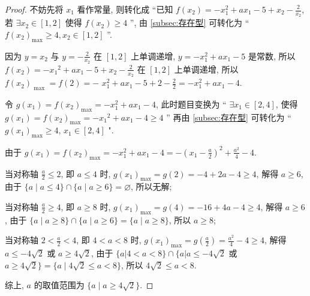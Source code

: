 \begin{proof}
  不妨先将 \({x}_{1}\) 看作常量, 则转化成 “已知 \(f\left( {x}_{2}\right)  =  -{x}_{1}^{2} + a{x}_{1} -5 + {x}_{2} -\frac{2}{{x}_{2}}\), 若 \(\exists {x}_{2} \in  \left\lbrack  {1, 2}\right\rbrack\) 使得 \(f\left( {x}_{2}\right)  \geq  4\) ”, 由 \ref{subsec:存在型} 可转化为 “ \(f{\left( {x}_{2}\right) }_{\max } \geq  4, {x}_{2} \in  \left\lbrack  {1, 2}\right\rbrack\) ”.

因为 \(y = {x}_{2}\) 与 \(y =  -\frac{2}{{x}_{2}}\) 在 \(\left\lbrack  {1, 2}\right\rbrack\) 上单调递增, \(y =  -{x}_{1}^{2} + a{x}_{1} -5\) 是常数, 所以 \(f\left( {x}_{2}\right)  =  -{x}_{1}{}^{2} + a{x}_{1} -5 + {x}_{2} -\frac{2}{{x}_{2}}\) 在 \(\left\lbrack  {1, 2}\right\rbrack\) 上单调递增, 所以 \(f{\left( {x}_{2}\right) }_{\text{ max }} = f\left( 2\right)  =  -\)  \({x}_{1}^{2} + a{x}_{1} -5 + 2 -\frac{2}{2} =  -{x}_{1}^{2} + a{x}_{1} -4.\)

令 \(g\left( {x}_{1}\right)  = f{\left( {x}_{2}\right) }_{\max } =  -{x}_{1}^{2} + a{x}_{1} -4\), 此时题目变换为 “ \(\exists {x}_{1} \in  \left\lbrack  {2, 4}\right\rbrack\), 使得 \(g\left( {x}_{1}\right)  = f{\left( {x}_{2}\right) }_{\max } =  -{x}_{1}{}^{2} + a{x}_{1} -4 \geq  4\) ” 再由 \ref{subsec:存在型} 可转化为 “ \(g{\left( {x}_{1}\right) }_{\max } \geq  4\), \({x}_{1} \in  \left\lbrack  {2, 4}\right\rbrack\) ".

由于 \(g\left( {x}_{1}\right)  = f{\left( {x}_{2}\right) }_{\max } =  -{x}_{1}^{2} + a{x}_{1} -4 =  -{\left( {x}_{1} -\frac{a}{2}\right) }^{2} + \frac{{a}^{2}}{4} -4\).

当对称轴 \(\frac{a}{2} \leq  2\), 即 \(a \leq  4\) 时, \(g{\left( {x}_{1}\right) }_{\max } = g\left( 2\right)  =  -4 + {2a} -4 \geq  4\), 解得 \(a \geq  6\), 由于 \(\{ a \mid  a \leq  4\}  \cap  \{ a \mid  a \geq  6\}  = \varnothing\), 所以无解;

当对称轴 \(\frac{a}{2} \geq  4\), 即 \(a \geq  8\) 时, \(g{\left( {x}_{1}\right) }_{\max } = g\left( 4\right)  =  -{16} + {4a} -4 \geq  4\), 解得 \(a \geq 6\), 由于 \(\{ a \mid  a \geq  8\}  \cap  \{ a \mid  a \geq  6\}  = \{ a \mid  a \geq  8\}\), 所以 \(a \geq  8\);

当对称轴 \(2 < \frac{a}{2} < 4\), 即 \(4 < a < 8\) 时, \(g{\left( {x}_{1}\right) }_{\max } = g\left( \frac{a}{2}\right)  = \frac{{a}^{2}}{4} -4 \geq  4\), 解得 \(a \leq   -4\sqrt{2}\) 或 \(a \geq  4\sqrt{2}\), 由于 \(\{ a\left| {4 < a < 8\} \cap \{ a}\right| a \leq   -4\sqrt{2}\) 或 \(a \geq  4\sqrt{2}\}  = \{ a \mid  4\sqrt{2} \leq a < 8\}\), 所以 \(4\sqrt{2} \leq  a < 8\).

综上, \(a\) 的取值范围为 \(\{ a \mid  a \geq  4\sqrt{2}\}\).
\end{proof}

